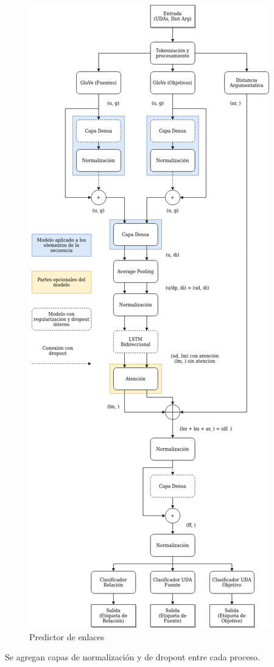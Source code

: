 \begin{figure}[h!]
	\begin{center}
		\begin{center}
			\includegraphics[scale=.3]{Graphics/Modelo Link Prediction.drawio.png}
        \end{center}
	    \caption{Predictor de enlaces}\label{fig:link_predictor}
	\end{center}
\end{figure}

Se agregan capas de normalización y de dropout entre cada proceso.

